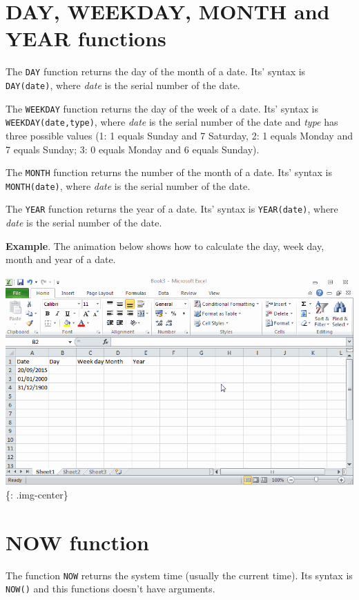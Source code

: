 \section{DAY, WEEKDAY, MONTH and YEAR functions}
\label{dayweekdaymonthandyearfunctions}

The \texttt{DAY} function returns the day of the month of a date. Its' syntax is \texttt{DAY(date)}, where \emph{date} is the serial number of the date. 

The \texttt{WEEKDAY} function returns the day of the week of a date. Its' syntax is \texttt{WEEKDAY(date,type)}, where \emph{date} is the serial number of the date and \emph{type} has three possible values (1: 1 equals Sunday and 7 Saturday, 2: 1 equals Monday and 7 equals Sunday; 3: 0 equals Monday and 6 equals Sunday).

The \texttt{MONTH} function returns the number of the month of a date. Its' syntax is \texttt{MONTH(date)}, where \emph{date} is the serial number of the date. 

The \texttt{YEAR} function returns the year of a date. Its' syntax is \texttt{YEAR(date)}, where \emph{date} is the serial number of the date. 

\textbf{Example}. The animation below shows how to calculate the day, week day, month and year of a date. 

\includegraphics[keepaspectratio,width=\textwidth,height=0.75\textheight]{img/example_function_day.gif}
\{: .img-center\}

\section{NOW function}
\label{nowfunction}

The function \texttt{NOW} returns the system time (usually the current time). Its syntax is \texttt{NOW()} and this functions doesn't have arguments. 

